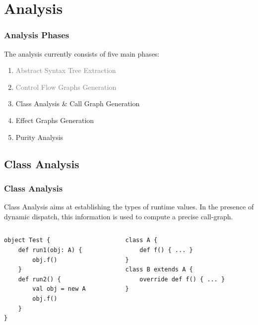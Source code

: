 \documentclass[hyperref={pdfpagelabels=false}]{beamer}
\begin{document}
\section{Analysis}
\begin{frame}
    \frametitle{Analysis Phases}
    The analysis currently consists of five main phases:
    \begin{enumerate}
        \item \textcolor{gray}{Abstract Syntax Tree Extraction}
        \item \textcolor{gray}{Control Flow Graphs Generation}
        \item Class Analysis \& Call Graph Generation
        \item Effect Graphs Generation
        \item Purity Analysis
    \end{enumerate}
\end{frame}

\subsection{Class Analysis}
\begin{frame}[fragile]
\frametitle{Class Analysis}

    Class Analysis aims at establishing the types of runtime values. In
    the presence of dynamic dispatch, this information is used to compute a
    precise call-graph.

    \begin{columns}
      \begin{column}{0.5\textwidth}
\begin{lstlisting}
object Test {
    def run1(obj: A) {
        obj.f()
    }
    def run2() {
        val obj = new A
        obj.f()
    }
}
\end{lstlisting}
      \end{column}
      \begin{column}{0.5\textwidth}
\begin{lstlisting}
class A {
    def f() { ... }
}
class B extends A {
    override def f() { ... }
}
\end{lstlisting}
      \end{column}
    \end{columns}


\end{frame}
\end{document}
